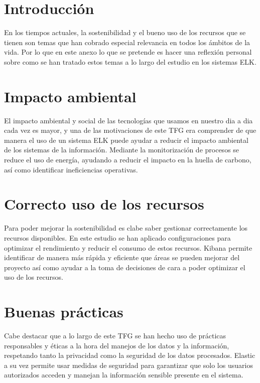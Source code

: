 
\section{Introducción}
En los tiempos actuales, la sostenibilidad y el bueno uso de los recursos que se tienen son temas que han cobrado especial relevancia en todos los ámbitos de la vida. Por lo que en este anexo lo que se pretende es hacer una reflexión personal sobre como se han tratado estos temas a lo largo del estudio en los sistemas ELK.

\section{Impacto ambiental}
El impacto ambiental y social de las tecnologías que usamos en nuestro dia a dia cada vez es mayor, y una de las motivaciones de este TFG era comprender de que manera el uso de un sistema ELK puede ayudar a reducir el impacto ambiental de los sistemas de la información. Mediante la monitorización de procesos se reduce el uso de energía, ayudando a reducir el impacto en la huella de carbono, así como identificar ineficiencias operativas.

\section{Correcto uso de los recursos}
Para poder mejorar la sostenibilidad es clabe saber gestionar correctamente los recursos disponibles. En este estudio se han aplicado configuraciones para optimizar el rendimiento y reducir el consumo de estos recursos. Kibana permite identificar de manera más rápida y eficiente que áreas se pueden mejorar del proyecto así como ayudar a la toma de decisiones de cara a poder optimizar el uso de los recursos.

\section{Buenas prácticas}
Cabe destacar que a lo largo de este TFG se han hecho uso de prácticas responsables y éticas a la hora del manejos de los datos y la información, respetando tanto la privacidad como la seguridad de los datos procesados. Elastic a su vez permite usar medidas de seguridad para garantizar que solo los usuarios autorizados acceden y manejan la información sensible presente en el sistema.
